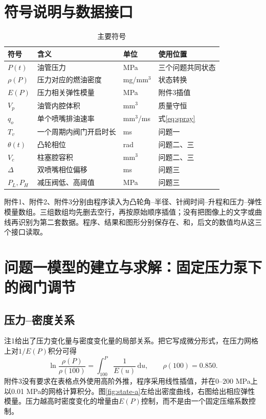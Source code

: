 \documentclass[UTF8,11pt,a4paper]{ctexart}
\newcommand{\dd}{\,\mathrm d}
\begin{document}
\section{符号说明与数据接口}
\begin{table}[H]
\centering
\caption{主要符号}
\label{tab:symbols-a}
\small
\begin{tabularx}{\textwidth}{p{2.4cm}p{5.2cm}p{3.0cm}X}
\toprule
符号 & 含义 & 单位 & 使用位置\\
\midrule
$P(t)$ & 油管压力 & MPa & 三个问题共同状态\\
$\rho(P)$ & 压力对应的燃油密度 & mg/mm$^3$ & 状态转换\\
$E(P)$ & 压力相关弹性模量 & MPa & 附件3插值\\
$V_p$ & 油管内腔体积 & mm$^3$ & 质量守恒\\
$q_o$ & 单个喷嘴排油速率 & mm$^3$/ms & 式\eqref{eq:spray}\\
$T_v$ & 一个周期内阀门开启时长 & ms & 问题一\\
$\theta(t)$ & 凸轮相位 & rad & 问题二、三\\
$V_c$ & 柱塞腔容积 & mm$^3$ & 问题二、三\\
$\Delta$ & 双喷嘴相位偏移 & ms & 问题三\\
$P_L,P_H$ & 减压阀低、高阈值 & MPa & 问题三\\
\bottomrule
\end{tabularx}
\end{table}

附件1、附件2、附件3分别由程序读入为凸轮角--半径、针阀时间--升程和压力--弹性模量数组。三组数组均先删去空行，再按原始顺序插值；没有把图像上的文字或曲线再识别为第二套数据。程序、结果和图形分别保存在、和，后文的数值均从这三个接口读取。

\section{问题一模型的建立与求解：固定压力泵下的阀门调节}
\label{mcm-q1-start}

\subsection{压力--密度关系}

注1给出了压力变化量与密度变化量的局部关系。把它写成微分形式，在压力网格上对$1/E(P)$积分可得
\begin{equation}
  \ln\frac{\rho(P)}{\rho(100)}=\int_{100}^{P}\frac{1}{E(u)}\dd u,
  \qquad \rho(100)=0.850.
\label{eq:rho}
\end{equation}
附件3没有要求在表格点外使用高阶外推，程序采用线性插值，并在$0$--$200$ MPa上以0.01 MPa的网格计算积分。图\ref{fig:state-a}左给出密度曲线，右图给出相应弹性模量。压力越高时密度变化的增量由$E(P)$控制，而不是由一个固定压缩系数控制。
\end{document}
